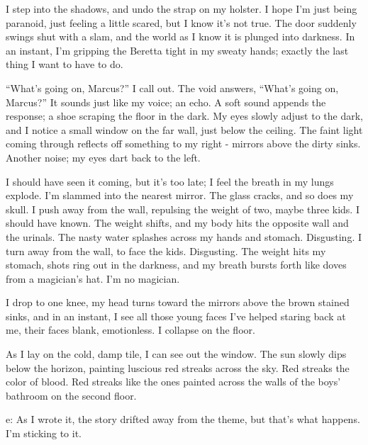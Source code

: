 I step into the shadows, and undo the strap on my holster. I hope
I'm just being paranoid, just feeling a little scared, but I know
it's not true. The door suddenly swings shut with a slam, and the
world as I know it is plunged into darkness. In an instant, I'm
gripping the Beretta tight in my sweaty hands; exactly the last
thing I want to have to do.



``What's going on, Marcus?'' I call out. The void answers, ``What's
going on, Marcus?'' It sounds just like my voice; an echo. A soft
sound appends the response; a shoe scraping the floor in the dark.
My eyes slowly adjust to the dark, and I notice a small window on
the far wall, just below the ceiling. The faint light coming
through reflects off something to my right - mirrors above the
dirty sinks. Another noise; my eyes dart back to the left.



I should have seen it coming, but it's too late; I feel the breath
in my lungs explode. I'm slammed into the nearest mirror. The glass
cracks, and so does my skull. I push away from the wall, repulsing
the weight of two, maybe three kids. I should have known. The
weight shifts, and my body hits the opposite wall and the urinals.
The nasty water splashes across my hands and stomach. Disgusting. I
turn away from the wall, to face the kids. Disgusting. The weight
hits my stomach, shots ring out in the darkness, and my breath
bursts forth like doves from a magician's hat. I'm no
magician.



I drop to one knee, my head turns toward the mirrors above the
brown stained sinks, and in an instant, I see all those young faces
I've helped staring back at me, their faces blank, emotionless. I
collapse on the floor.



As I lay on the cold, damp tile, I can see out the window. The sun
slowly dips below the horizon, painting luscious red streaks across
the sky. Red streaks the color of blood. Red streaks like the ones
painted across the walls of the boys' bathroom on the second
floor.





e: As I wrote it, the story drifted away from the theme, but that's
what happens. I'm sticking to it. 
 






